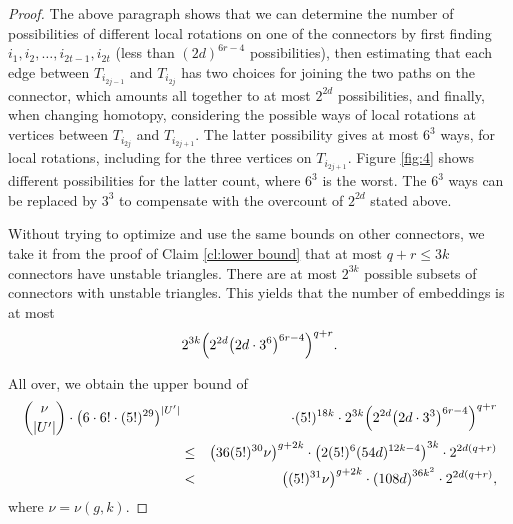 \documentclass[10pt,a4paper]{amsart}
\begin{document}
\begin{proof}
  The above paragraph shows that we can determine the number of possibilities of different local rotations on one of the connectors by first finding $i_1,i_2,\dots,i_{2t-1},i_{2t}$ (less than $(2d)^{6r-4}$ possibilities), then estimating that each edge between $T_{i_{2j-1}}$ and $T_{i_{2j}}$ has two choices for joining the two paths on the connector, which amounts all together to at most $2^{2d}$ possibilities, and finally, when changing homotopy, considering the possible ways of local rotations at vertices between $T_{i_{2j}}$ and $T_{i_{2j+1}}$. The latter possibility gives at most $6^3$ ways, for local rotations, including for the three vertices on $T_{i_{2j+1}}$. Figure \ref{fig:4} shows different possibilities for the latter count, where $6^3$ is the worst. The $6^3$ ways can be replaced by $3^3$ to compensate with the overcount of $2^{2d}$ stated above.

  Without trying to optimize and use the same bounds on other connectors, we take it from the proof of Claim \ref{cl:lower bound} that at most $q+r \le 3k$ connectors have unstable triangles. There are at most $2^{3k}$ possible subsets of connectors with unstable triangles. This yields that the number of embeddings is at most
  $$
     2^{3k}\Bigl(2^{2d} \bigl(2d\cdot 3^6\bigr)^{6r-4}\Bigr)^{q+r} .
  $$

  All over, we obtain the upper bound of
  \begin{eqnarray*}
     \binom{\nu}{|U'|} \cdot \left(6 \cdot 6! \cdot (5!)^{29}\right)^{|U'|} && \cdot (5!)^{18k} \cdot
     2^{3k} \Bigl(2^{2d} \bigl(2d\cdot 3^3\bigr)^{6r-4}\Bigl)^{q+r} \\
     &\le& \left(36 (5!)^{30} \nu\right)^{g+2k} \cdot \left( 2 (5!)^6 (54d)^{12k-4} \right)^{3k} \cdot 2^{2d(q+r)}  \\
     &<& \left((5!)^{31} \nu\right)^{g+2k} \cdot \left(108d\right)^{36k^2}
     \cdot 2^{2d(q+r)} ,
  \end{eqnarray*}
  where $\nu=\nu(g,k)$.
  \end{proof}
\end{document}

